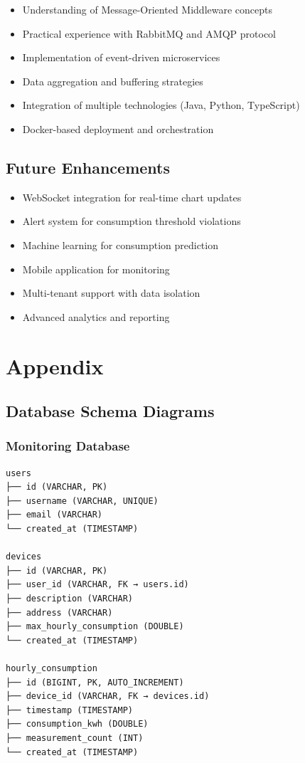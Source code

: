 \documentclass[12pt,a4paper]{article}
\begin{document}
\begin{itemize}
    \item Understanding of Message-Oriented Middleware concepts
    \item Practical experience with RabbitMQ and AMQP protocol
    \item Implementation of event-driven microservices
    \item Data aggregation and buffering strategies
    \item Integration of multiple technologies (Java, Python, TypeScript)
    \item Docker-based deployment and orchestration
\end{itemize}

\subsection{Future Enhancements}

\begin{itemize}
    \item WebSocket integration for real-time chart updates
    \item Alert system for consumption threshold violations
    \item Machine learning for consumption prediction
    \item Mobile application for monitoring
    \item Multi-tenant support with data isolation
    \item Advanced analytics and reporting
\end{itemize}

\newpage

\section{Appendix}

\subsection{Database Schema Diagrams}

\subsubsection{Monitoring Database}

\begin{verbatim}
users
├── id (VARCHAR, PK)
├── username (VARCHAR, UNIQUE)
├── email (VARCHAR)
└── created_at (TIMESTAMP)

devices
├── id (VARCHAR, PK)
├── user_id (VARCHAR, FK → users.id)
├── description (VARCHAR)
├── address (VARCHAR)
├── max_hourly_consumption (DOUBLE)
└── created_at (TIMESTAMP)

hourly_consumption
├── id (BIGINT, PK, AUTO_INCREMENT)
├── device_id (VARCHAR, FK → devices.id)
├── timestamp (TIMESTAMP)
├── consumption_kwh (DOUBLE)
├── measurement_count (INT)
└── created_at (TIMESTAMP)
\end{verbatim}
\end{document}
